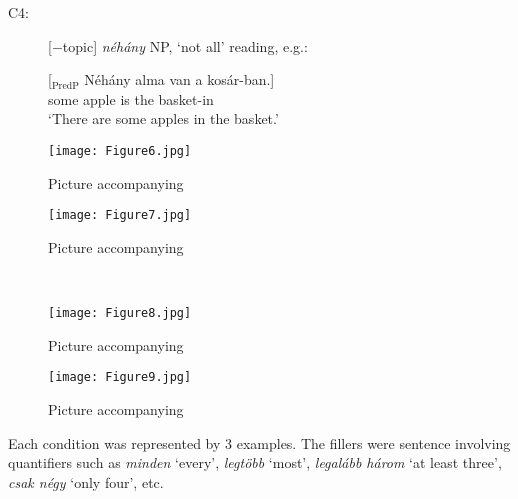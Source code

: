 \documentclass[output=paper]{langscibook}
\begin{document}
\begin{description}


\item[C4:] [$-$topic] \textit{néhány} NP, `not all' reading, e.g.:

\ea
\gll \label{kis-zet:alma}[$_\text{PredP}$ Néhány alma van a kosár-ban.]\\ 
{} some apple is the basket-in\\ 
\glt ‘There are some apples in the basket.’
\z


\end{description}

\begin{figure}[h]
\RawFloats\centering%
\begin{minipage}[b]{0.5\textwidth}
    \centering
    \texttt{[image: Figure6.jpg]}
    \caption{Picture accompanying }
    \label{kis-zet:c1}
\end{minipage}\begin{minipage}[b]{0.5\textwidth}
    \centering
    \texttt{[image: Figure7.jpg]}
    \caption{Picture accompanying }
    \label{kis-zet:c2}
\end{minipage}\\
\begin{minipage}[b]{0.5\textwidth}
    \centering
    \texttt{[image: Figure8.jpg]}
    \caption{Picture accompanying }
    \label{kis-zet:c3}
\end{minipage}\begin{minipage}[b]{0.5\textwidth}
    \centering
    \texttt{[image: Figure9.jpg]}
    \caption{Picture accompanying }
    \label{kis-zet:c4}
\end{minipage}%
\end{figure}

Each condition was represented by 3 examples. The fillers were sentence involving quantifiers such as  \textit{minden} `every',  \textit{legtöbb} `most',  \textit{legalább három} `at least three', \textit{csak négy} `only four', etc.
\end{document}
